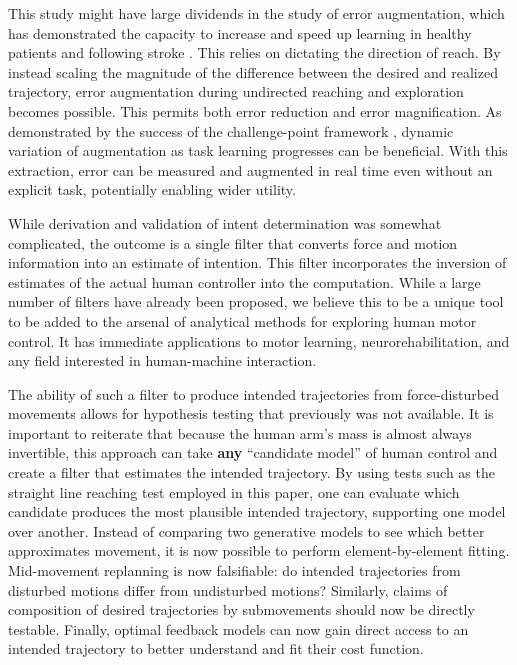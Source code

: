 \documentclass[10pt]{article}
\begin{document}
This study might have large dividends in the study of error augmentation, which has demonstrated the capacity to increase and speed up learning in healthy patients \cite{patton2004robot} and following stroke \cite{patton2006evaluation}. This relies on dictating the direction of reach. By instead scaling the magnitude of the difference between the desired and realized trajectory, error augmentation during undirected reaching and exploration becomes possible. This permits both error reduction and error magnification. As demonstrated by the success of the challenge-point framework \cite{guadagnoli2004challenge}, dynamic variation of augmentation as task learning progresses can be beneficial. With this extraction, error can be measured and augmented in real time even without an explicit task, potentially enabling wider utility.

While derivation and validation of intent determination was somewhat complicated, the outcome is a single filter that converts force and motion information into an estimate of intention. This filter incorporates the inversion of estimates of the actual human controller into the computation. While a large number of filters have already been proposed, we believe this to be a unique tool to be added to the arsenal of analytical methods for exploring human motor control. It has immediate applications to motor learning, neurorehabilitation, and any field interested in human-machine interaction.  

The ability of such a filter to produce intended trajectories from force-disturbed movements allows for hypothesis testing that previously was not available. It is important to reiterate that because the human arm’s mass is almost always invertible, this approach can take \textbf{any} “candidate model” of human control and create a filter that estimates the intended trajectory. By using tests such as the straight line reaching test employed in this paper, one can evaluate which candidate produces the most plausible intended trajectory, supporting one model over another.  Instead of comparing two generative models to see which better approximates movement, it is now possible to perform element-by-element fitting. Mid-movement replanning is now falsifiable: do intended trajectories from disturbed motions differ from undisturbed motions? Similarly, claims of composition of desired trajectories by submovements should now be directly testable. Finally, optimal feedback models can now gain direct access to an intended trajectory to better understand and fit their cost function.
\end{document}
